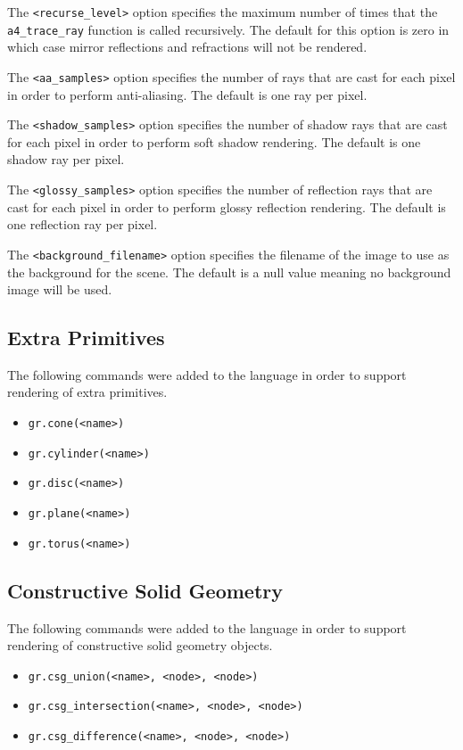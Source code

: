 The \verb|<recurse_level>| option specifies the maximum number of times that the
\verb|a4_trace_ray| function is called recursively. The default for this option
is zero in which case mirror reflections and refractions will not be rendered.

The \verb|<aa_samples>| option specifies the number of rays that are cast for each
pixel in order to perform anti-aliasing. The default is one ray per pixel.

The \verb|<shadow_samples>| option specifies the number of shadow rays that are
cast for each pixel in order to perform soft shadow rendering. The default is
one shadow ray per pixel.

The \verb|<glossy_samples>| option specifies the number of reflection rays that
are cast for each pixel in order to perform glossy reflection rendering. The
default is one reflection ray per pixel.

The \verb|<background_filename>| option specifies the filename of the image to
use as the background for the scene. The default is a null value meaning no
background image will be used.

\subsection*{Extra Primitives}
The following commands were added to the language in order to support rendering
of extra primitives.
\begin{itemize}
  \item \verb|gr.cone(<name>)|
  \item \verb|gr.cylinder(<name>)|
  \item \verb|gr.disc(<name>)|
  \item \verb|gr.plane(<name>)|
  \item \verb|gr.torus(<name>)|
\end{itemize}

\subsection*{Constructive Solid Geometry}
The following commands were added to the language in order to support rendering
of constructive solid geometry objects.
\begin{itemize}
  \item \verb|gr.csg_union(<name>, <node>, <node>)|
  \item \verb|gr.csg_intersection(<name>, <node>, <node>)|
  \item \verb|gr.csg_difference(<name>, <node>, <node>)|
\end{itemize}

